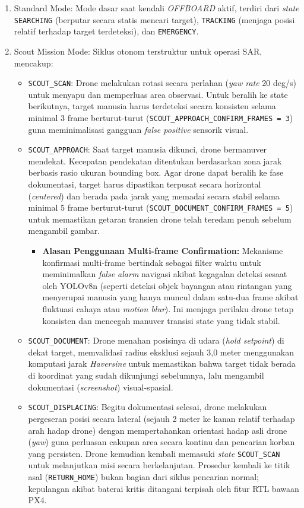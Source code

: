 \begin{enumerate}
	\item Standard Mode: Mode dasar saat kendali \textit{OFFBOARD} aktif, terdiri dari \textit{state} \texttt{SEARCHING} (berputar secara statis mencari target), \texttt{TRACKING} (menjaga posisi relatif terhadap target terdeteksi), dan \texttt{EMERGENCY}.
	\item Scout Mission Mode: Siklus otonom terstruktur untuk operasi SAR, mencakup:
	\begin{itemize}
		\item \texttt{SCOUT\_SCAN}: Drone melakukan rotasi secara perlahan (\textit{yaw rate} 20 deg/s) untuk menyapu dan memperluas area observasi. Untuk beralih ke state berikutnya, target manusia harus terdeteksi secara konsisten selama minimal 3 frame berturut-turut (\texttt{SCOUT\_APPROACH\_CONFIRM\_FRAMES = 3}) guna meminimalisasi gangguan \textit{false positive} sensorik visual.
		\item \texttt{SCOUT\_APPROACH}: Saat target manusia dikunci, drone bermanuver mendekat. Kecepatan pendekatan ditentukan berdasarkan zona jarak berbasis rasio ukuran bounding box. Agar drone dapat beralih ke fase dokumentasi, target harus dipastikan terpusat secara horizontal (\textit{centered}) dan berada pada jarak yang memadai secara stabil selama minimal 5 frame berturut-turut (\texttt{SCOUT\_DOCUMENT\_CONFIRM\_FRAMES = 5}) untuk memastikan getaran transien drone telah teredam penuh sebelum mengambil gambar.
		\begin{itemize}
			\item \textbf{Alasan Penggunaan Multi-frame Confirmation:} Mekanisme konfirmasi multi-frame bertindak sebagai filter waktu untuk meminimalkan \textit{false alarm} navigasi akibat kegagalan deteksi sesaat oleh YOLOv8n (seperti deteksi objek bayangan atau rintangan yang menyerupai manusia yang hanya muncul dalam satu-dua frame akibat fluktuasi cahaya atau \textit{motion blur}). Ini menjaga perilaku drone tetap konsisten dan mencegah manuver transisi state yang tidak stabil.
		\end{itemize}
		\item \texttt{SCOUT\_DOCUMENT}: Drone menahan posisinya di udara (\textit{hold setpoint}) di dekat target, memvalidasi radius eksklusi sejauh 3,0 meter menggunakan komputasi jarak \textit{Haversine} untuk memastikan bahwa target tidak berada di koordinat yang sudah dikunjungi sebelumnya, lalu mengambil dokumentasi (\textit{screenshot}) visual-spasial.
		\item \texttt{SCOUT\_DISPLACING}: Begitu dokumentasi selesai, drone melakukan pergeseran posisi secara lateral (sejauh 2 meter ke kanan relatif terhadap arah hadap drone) dengan mempertahankan orientasi hadap asli drone (\textit{yaw}) guna perluasan cakupan area secara kontinu dan pencarian korban yang persisten. Drone kemudian kembali memasuki \textit{state} \texttt{SCOUT\_SCAN} untuk melanjutkan misi secara berkelanjutan. Prosedur kembali ke titik asal (\texttt{RETURN\_HOME}) bukan bagian dari siklus pencarian normal; kepulangan akibat baterai kritis ditangani terpisah oleh fitur RTL bawaan PX4.
	\end{itemize}
\end{enumerate}

